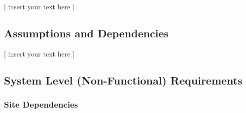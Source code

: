\documentclass[twoside,letterpaper]{article}
\begin{document}
[ insert your text here ]%

\subsection{Assumptions and Dependencies}

[ insert your text here ]

\subsection{System Level (Non-Functional) Requirements}

\subsubsection{Site Dependencies}
\end{document}
